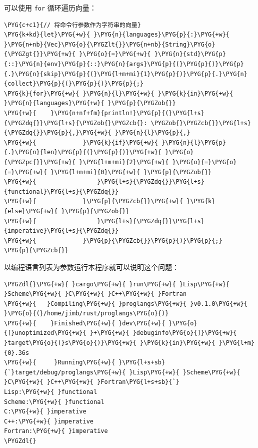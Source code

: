 可以使用 \texttt{for} 循环遍历向量：

\begin{Verbatim}[commandchars=\\\{\},breaklines=true,breakanywhere=true,fontsize=\codefont,xleftmargin=17bp]
\PYG{c+c1}{// 将命令行参数作为字符串的向量}
\PYG{k+kd}{let}\PYG{+w}{ }\PYG{n}{languages}\PYG{p}{:}\PYG{+w}{ }\PYG{n+nb}{Vec}\PYG{o}{\PYGZlt{}}\PYG{n+nb}{String}\PYG{o}{\PYGZgt{}}\PYG{+w}{ }\PYG{o}{=}\PYG{+w}{ }\PYG{n}{std}\PYG{p}{::}\PYG{n}{env}\PYG{p}{::}\PYG{n}{args}\PYG{p}{(}\PYG{p}{)}\PYG{p}{.}\PYG{n}{skip}\PYG{p}{(}\PYG{l+m+mi}{1}\PYG{p}{)}\PYG{p}{.}\PYG{n}{collect}\PYG{p}{(}\PYG{p}{)}\PYG{p}{;}
\PYG{k}{for}\PYG{+w}{ }\PYG{n}{l}\PYG{+w}{ }\PYG{k}{in}\PYG{+w}{ }\PYG{n}{languages}\PYG{+w}{ }\PYG{p}{\PYGZob{}}
\PYG{+w}{    }\PYG{n+nf+fm}{println!}\PYG{p}{(}\PYG{l+s}{\PYGZdq{}}\PYG{l+s}{\PYGZob{}\PYGZcb{}: \PYGZob{}\PYGZcb{}}\PYG{l+s}{\PYGZdq{}}\PYG{p}{,}\PYG{+w}{ }\PYG{n}{l}\PYG{p}{,}
\PYG{+w}{             }\PYG{k}{if}\PYG{+w}{ }\PYG{n}{l}\PYG{p}{.}\PYG{n}{len}\PYG{p}{(}\PYG{p}{)}\PYG{+w}{ }\PYG{o}{\PYGZpc{}}\PYG{+w}{ }\PYG{l+m+mi}{2}\PYG{+w}{ }\PYG{o}{=}\PYG{o}{=}\PYG{+w}{ }\PYG{l+m+mi}{0}\PYG{+w}{ }\PYG{p}{\PYGZob{}}
\PYG{+w}{                 }\PYG{l+s}{\PYGZdq{}}\PYG{l+s}{functional}\PYG{l+s}{\PYGZdq{}}
\PYG{+w}{             }\PYG{p}{\PYGZcb{}}\PYG{+w}{ }\PYG{k}{else}\PYG{+w}{ }\PYG{p}{\PYGZob{}}
\PYG{+w}{                 }\PYG{l+s}{\PYGZdq{}}\PYG{l+s}{imperative}\PYG{l+s}{\PYGZdq{}}
\PYG{+w}{             }\PYG{p}{\PYGZcb{}}\PYG{p}{)}\PYG{p}{;}
\PYG{p}{\PYGZcb{}}
\end{Verbatim}

以编程语言列表为参数运行本程序就可以说明这个问题：

\begin{Verbatim}[commandchars=\\\{\},breaklines=true,breakanywhere=true,fontsize=\codefont,xleftmargin=17bp]
\PYGZdl{}\PYG{+w}{ }cargo\PYG{+w}{ }run\PYG{+w}{ }Lisp\PYG{+w}{ }Scheme\PYG{+w}{ }C\PYG{+w}{ }C++\PYG{+w}{ }Fortran
\PYG{+w}{   }Compiling\PYG{+w}{ }proglangs\PYG{+w}{ }v0.1.0\PYG{+w}{ }\PYG{o}{(}/home/jimb/rust/proglangs\PYG{o}{)}
\PYG{+w}{    }Finished\PYG{+w}{ }dev\PYG{+w}{ }\PYG{o}{[}unoptimized\PYG{+w}{ }+\PYG{+w}{ }debuginfo\PYG{o}{]}\PYG{+w}{ }target\PYG{o}{(}s\PYG{o}{)}\PYG{+w}{ }\PYG{k}{in}\PYG{+w}{ }\PYG{l+m}{0}.36s
\PYG{+w}{     }Running\PYG{+w}{ }\PYG{l+s+sb}{`}target/debug/proglangs\PYG{+w}{ }Lisp\PYG{+w}{ }Scheme\PYG{+w}{ }C\PYG{+w}{ }C++\PYG{+w}{ }Fortran\PYG{l+s+sb}{`}
Lisp:\PYG{+w}{ }functional
Scheme:\PYG{+w}{ }functional
C:\PYG{+w}{ }imperative
C++:\PYG{+w}{ }imperative
Fortran:\PYG{+w}{ }imperative
\PYGZdl{}
\end{Verbatim}

